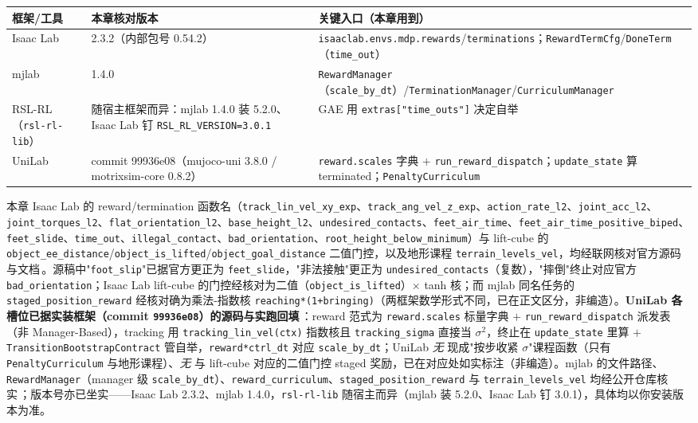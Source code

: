 \begin{center}
\small
\begin{tabular}{@{}lll@{}}
\toprule
框架/工具 & 本章核对版本 & 关键入口（本章用到） \\
\midrule
Isaac Lab & 2.3.2（内部包号 0.54.2） & \verb|isaaclab.envs.mdp.rewards|/\verb|terminations|；\verb|RewardTermCfg|/\verb|DoneTerm|（\verb|time_out|） \\
mjlab & 1.4.0\,\cite{mjlab2026} & \verb|RewardManager|（\verb|scale_by_dt|）/\verb|TerminationManager|/\verb|CurriculumManager| \\
RSL-RL（\verb|rsl-rl-lib|） & 随宿主框架而异：mjlab 1.4.0 装 5.2.0、Isaac Lab 钉 \verb|RSL_RL_VERSION=3.0.1|\,\cite{schwarke2025rslrl} & GAE 用 \verb|extras["time_outs"]| 决定自举 \\
UniLab & commit 99936e08（mujoco-uni 3.8.0 / motrixsim-core 0.8.2）\,\cite{unilab2026} & \verb|reward.scales| 字典 $+$ \verb|run_reward_dispatch|；\verb|update_state| 算 terminated；\verb|PenaltyCurriculum| \\
\bottomrule
\end{tabular}
\end{center}

\begin{finenote}
本章 Isaac Lab 的 reward/termination 函数名（\verb|track_lin_vel_xy_exp|、\verb|track_ang_vel_z_exp|、\verb|action_rate_l2|、\verb|joint_acc_l2|、\verb|joint_torques_l2|、\verb|flat_orientation_l2|、\verb|base_height_l2|、\verb|undesired_contacts|、\verb|feet_air_time|、\verb|feet_air_time_positive_biped|、\verb|feet_slide|、\verb|time_out|、\verb|illegal_contact|、\verb|bad_orientation|、\verb|root_height_below_minimum|）与 lift-cube 的 \verb|object_ee_distance|/\verb|object_is_lifted|/\verb|object_goal_distance| 二值门控，以及地形课程 \verb|terrain_levels_vel|，均经联网核对官方源码与文档\,\cite{isaaclab2024}。源稿中"\verb|foot_slip|"已据官方更正为 \verb|feet_slide|，"非法接触"更正为 \verb|undesired_contacts|（复数），"摔倒"终止对应官方 \verb|bad_orientation|；Isaac Lab lift-cube 的门控经核对为二值（\verb|object_is_lifted|）$\times$ tanh 核；而 mjlab 同名任务的 \verb|staged_position_reward| 经核对确为乘法-指数核 \verb|reaching*(1+bringing)|（两框架数学形式不同，已在正文区分，非编造）。\textbf{UniLab 各槽位已据实装框架（commit \texttt{99936e08}）的源码与实跑回填}\,\cite{unilab2026}：reward 范式为 \verb|reward.scales| 标量字典 $+$ \verb|run_reward_dispatch| 派发表（非 Manager-Based），tracking 用 \verb|tracking_lin_vel(ctx)| 指数核且 \verb|tracking_sigma| 直接当 $\sigma^2$，终止在 \verb|update_state| 里算 $+$ \verb|TransitionBootstrapContract| 管自举，\verb|reward*ctrl_dt| 对应 \verb|scale_by_dt|；UniLab \emph{无} 现成"按步收紧 $\sigma$"课程函数（只有 \verb|PenaltyCurriculum| 与地形课程）、\emph{无} 与 lift-cube 对应的二值门控 staged 奖励，已在对应处如实标注（非编造）。mjlab 的文件路径、\verb|RewardManager|（manager 级 \verb|scale_by_dt|）、\verb|reward_curriculum|、\verb|staged_position_reward| 与 \verb|terrain_levels_vel| 均经公开仓库核实\,\cite{mjlab2026}；版本号亦已坐实——Isaac Lab 2.3.2、mjlab 1.4.0，\verb|rsl-rl-lib| 随宿主而异（mjlab 装 5.2.0、Isaac Lab 钉 3.0.1），具体均以你安装版本为准。
\end{finenote}
